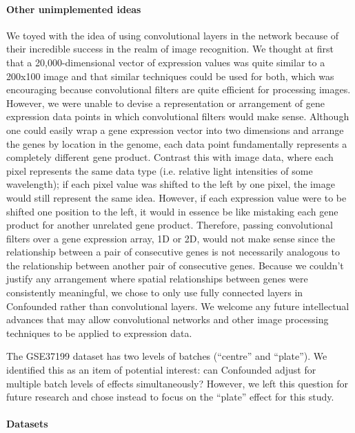 \documentclass{article}
\begin{document}
\paragraph{Other unimplemented ideas}

We toyed with the idea of using convolutional layers \cite{krizhevsky_imagenet_2012-1} in the network because of their incredible success in the realm of image recognition.
We thought at first that a 20,000-dimensional vector of expression values was quite similar to a 200x100 image and that similar techniques could be used for both, which was encouraging because convolutional filters are quite efficient for processing images.
However, we were unable to devise a representation or arrangement of gene expression data points in which convolutional filters would make sense.
Although one could easily wrap a gene expression vector into two dimensions and arrange the genes by location in the genome, each data point fundamentally represents a completely different gene product.
Contrast this with image data, where each pixel represents the same data type (i.e. relative light intensities of some wavelength); if each pixel value was shifted to the left by one pixel, the image would still represent the same idea.
However, if each expression value were to be shifted one position to the left, it would in essence be like mistaking each gene product for another unrelated gene product.
Therefore, passing convolutional filters over a gene expression array, 1D or 2D, would not make sense since the relationship between a pair of consecutive genes is not necessarily analogous to the relationship between another pair of consecutive genes.
Because we couldn't justify any arrangement where spatial relationships between genes were consistently meaningful, we chose to only use fully connected layers in Confounded rather than convolutional layers.
We welcome any future intellectual advances that may allow convolutional networks and other image processing techniques to be applied to expression data.

The GSE37199 dataset has two levels of batches (``centre'' and ``plate'').
We identified this as an item of potential interest: can Confounded adjust for multiple batch levels of effects simultaneously?
However, we left this question for future research and chose instead to focus on the ``plate'' effect for this study.

\paragraph{Datasets}
\end{document}
